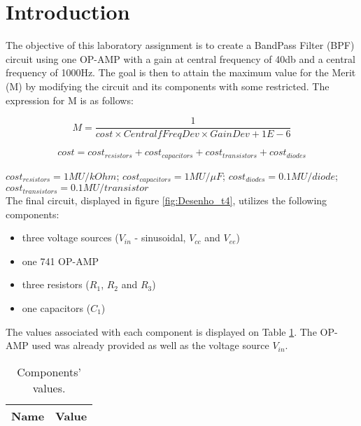 
\section{Introduction}
\label{sec:introduction}



The objective of this laboratory assignment is to create a BandPass Filter (BPF) circuit using one OP-AMP with a gain at central frequency of 40db and a central frequency of 1000Hz. The goal is then to attain the maximum value for the Merit (M) by modifying the circuit and its components with some restricted. The expression for M is as follows:

\[
M = \frac{1}{cost\times CentralfFreqDev\times GainDev + 1E-6}
\]

\[
 cost = cost_{resistors} + cost_{capacitors} + cost_{transistors} + cost_{diodes} 
\]

$cost_{resistors} = 1MU/kOhm$; $cost_{capacitors} = 1MU/\mu F$;
$cost_{diodes} = 0.1MU/diode$; $cost_{transistors} = 0.1MU/transistor$ \\

The final circuit, displayed in figure \ref{fig:Desenho_t4}, utilizes the following components:

\begin{itemize}
	\item three voltage sources ($V_{in}$ - sinusoidal, $V_{cc}$ and $V_{ee}$)
	\item one 741 OP-AMP
	\item three resistors ($R_1$, $R_2$ and $R_3$)
	\item one capacitors ($C_1$)
\end{itemize}

The values associated with each component is displayed on Table \ref{tab:vlr}. The OP-AMP used was already provided as well as the voltage source $V_{in}$.

\begin{table}[ht]
	\centering
	\begin{tabular}{|l|r|}
		\hline    
		{\bf Name} & {\bf Value} \\ \hline
    		
	\end{tabular}
	
	\caption{Components' values.}
    
\label{tab:vlr}
\end{table}


